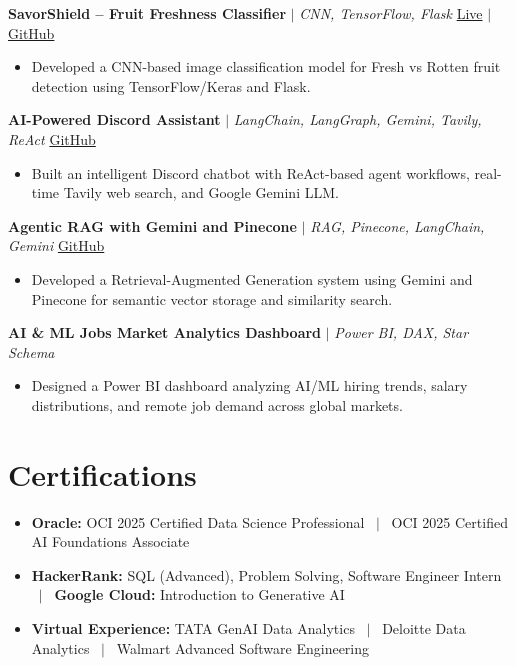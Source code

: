 \documentclass[a4paper,9pt]{article}
\newcommand{\resumeItem}[1]{\item\small #1}
\begin{document}
\vspace{1pt}
\noindent\textbf{SavorShield -- Fruit Freshness Classifier} $|$ \textit{CNN, TensorFlow, Flask} \hfill
\href{https://huggingface.co/spaces/Harsh0809/fruit-quality-classification-cnn}{\small Live} $|$
\href{https://github.com/hsachan295-source/Fruit-Quality-Classification-CNN}{\small GitHub}
\begin{itemize}
\resumeItem{Developed a CNN-based image classification model for Fresh vs Rotten fruit detection using TensorFlow/Keras and Flask.}
\end{itemize}

\vspace{1pt}
\noindent\textbf{AI-Powered Discord Assistant} $|$ \textit{LangChain, LangGraph, Gemini, Tavily, ReAct} \hfill
\href{https://github.com/hsachan295-source/AI-Powered-Discord-Assistant}{\small GitHub}
\begin{itemize}
\resumeItem{Built an intelligent Discord chatbot with ReAct-based agent workflows, real-time Tavily web search, and Google Gemini LLM.}
\end{itemize}

\vspace{1pt}
\noindent\textbf{Agentic RAG with Gemini and Pinecone} $|$ \textit{RAG, Pinecone, LangChain, Gemini} \hfill
\href{https://github.com/hsachan295-source/Agentic-RAG-with-Gemini-and-Pinecone}{\small GitHub}
\begin{itemize}
\resumeItem{Developed a Retrieval-Augmented Generation system using Gemini and Pinecone for semantic vector storage and similarity search.}
\end{itemize}

\vspace{1pt}
\noindent\textbf{AI \& ML Jobs Market Analytics Dashboard} $|$ \textit{Power BI, DAX, Star Schema}
\begin{itemize}
\resumeItem{Designed a Power BI dashboard analyzing AI/ML hiring trends, salary distributions, and remote job demand across global markets.}
\end{itemize}

\vspace{-2mm}

\section{Certifications}
\begin{itemize}
\resumeItem{\textbf{Oracle:} OCI 2025 Certified Data Science Professional ~$|$~ OCI 2025 Certified AI Foundations Associate}
\resumeItem{\textbf{HackerRank:} SQL (Advanced), Problem Solving, Software Engineer Intern ~$|$~ \textbf{Google Cloud:} Introduction to Generative AI}
\resumeItem{\textbf{Virtual Experience:} TATA GenAI Data Analytics ~$|$~ Deloitte Data Analytics ~$|$~ Walmart Advanced Software Engineering}
\end{itemize}
\end{document}
